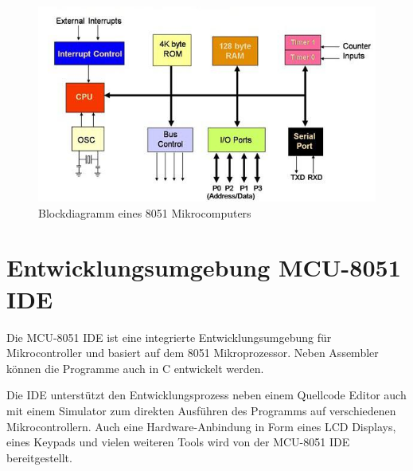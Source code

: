 \begin{figure}[htbp]
	\centering
	\includegraphics[scale=0.75]{img/8051-diagram}
	\caption{Blockdiagramm eines 8051 Mikrocomputers}
	\label{img:8051}
\end{figure}


\section{Entwicklungsumgebung MCU-8051 IDE} \label{section:ide}

Die MCU-8051 IDE ist eine integrierte Entwicklungsumgebung für Mikrocontroller und basiert auf dem 8051 Mikroprozessor. Neben Assembler können die Programme auch in C entwickelt werden.

Die IDE unterstützt den Entwicklungsprozess neben einem Quellcode Editor auch mit einem Simulator zum direkten Ausführen des Programms auf verschiedenen Mikrocontrollern. Auch eine Hardware-Anbindung in Form eines LCD Displays, eines Keypads und vielen weiteren Tools wird von der MCU-8051 IDE bereitgestellt.\cite{bib:mcu}